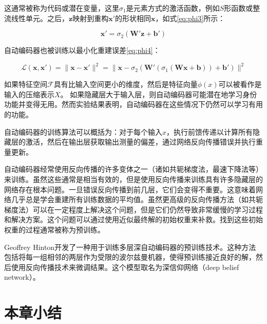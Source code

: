 这通常被称为代码或潜在变量，这里$\sigma _ {1}$是元素方式的激活函数，例如$S$形函数或整流线性单元。之后，$\mathbf {z}$映射到重构$\mathbf {x'}$的形状相同$\mathbf {x}$，如式\ref{eq:phi3}所示：

{\setlength\abovedisplayskip{15pt}
\setlength\belowdisplayskip{15pt}
\begin{equation}
    \label{eq:phi3}
   \mathbf {x'} =\sigma _{2}(\mathbf {W'z} +\mathbf {b'} )
\end{equation}}

自动编码器也被训练以最小化重建误差\ref{eq:phi4}：

{\setlength\abovedisplayskip{15pt}
\setlength\belowdisplayskip{15pt}
\begin{equation}
    \label{eq:phi4}
    {\mathcal {L}}(\mathbf {x} ,\mathbf {x'} )=\|\mathbf {x} -\mathbf {x'} \|^{2}=\|\mathbf {x} -\sigma _{2}(\mathbf {W'} (\sigma _{1}(\mathbf {Wx} +\mathbf {b} ))+\mathbf {b'} )\|^{2}
\end{equation}}

如果特征空间${\mathcal {F}}$具有比输入空间更小的维度{}，然后是特征向量$\phi(x)$可以被看作是输入的压缩表示$X$。 如果隐藏层大于输入层，则自动编码器可能潜在地学习身份功能并变得无用。然而实验结果表明，自动编码器在这些情况下仍然可以学习有用的功能\cite{bengio2009learning}。

自动编码器的训练算法可以概括为：对于每个输入$x$，执行前馈传递以计算所有隐藏层的激活，然后在输出层获取输出测量的偏差，通过网络反向传播错误并执行重量更新。

自动编码器经常使用反向传播的许多变体之一（诸如共轭梯度法，最速下降法等）来训练。虽然这些通常是相当有效的，但是使用反向传播来训练具有许多隐藏层的网络存在根本问题。一旦错误反向传播到前几层，它们会变得不重要。这意味着网络几乎总是学会重建所有训练数据的平均值。虽然更高级的反向传播方法（如共轭梯度法）可以在一定程度上解决这个问题，但是它们仍然导致非常缓慢的学习过程和解决方案。这个问题可以通过使用近似最终解的初始权重来补救。找到这些初始权重的过程通常被称为预训练。

Geoffrey Hinton开发了一种用于训练多层深自动编码器的预训练技术。这种方法包括将每一组相邻的两层作为受限的波尔兹曼机器\cite{smolensky1986information}，使得预训练接近良好的解，然后使用反向传播技术来微调结果。这个模型取名为深信仰网络（deep belief network）\cite{hinton2009deep}。

\section{本章小结}

